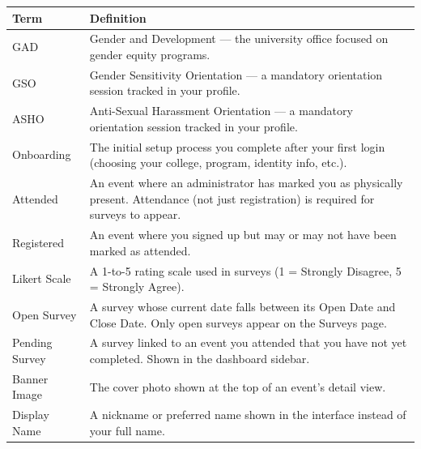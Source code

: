 \documentclass[12pt, a4paper]{article}
\begin{document}
\begin{longtable}{|>{\raggedright\arraybackslash}p{4cm}|>{\raggedright\arraybackslash}p{9cm}|}
\hline
\rowcolor{lightgray}
\textbf{Term} & \textbf{Definition} \\
\hline
GAD & Gender and Development — the university office focused on gender equity programs. \\
\hline
GSO & Gender Sensitivity Orientation — a mandatory orientation session tracked in your profile. \\
\hline
ASHO & Anti-Sexual Harassment Orientation — a mandatory orientation session tracked in your profile. \\
\hline
Onboarding & The initial setup process you complete after your first login (choosing your college, program, identity info, etc.). \\
\hline
Attended & An event where an administrator has marked you as physically present. Attendance (not just registration) is required for surveys to appear. \\
\hline
Registered & An event where you signed up but may or may not have been marked as attended. \\
\hline
Likert Scale & A 1-to-5 rating scale used in surveys (1 = Strongly Disagree, 5 = Strongly Agree). \\
\hline
Open Survey & A survey whose current date falls between its Open Date and Close Date. Only open surveys appear on the Surveys page. \\
\hline
Pending Survey & A survey linked to an event you attended that you have not yet completed. Shown in the dashboard sidebar. \\
\hline
Banner Image & The cover photo shown at the top of an event's detail view. \\
\hline
Display Name & A nickname or preferred name shown in the interface instead of your full name. \\
\hline
\end{longtable}
\end{document}
